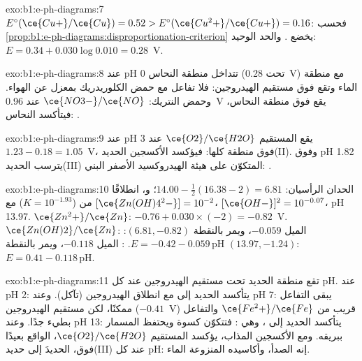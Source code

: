 \begin{solution}{exo:b1:e-ph-diagrams:7}
$E^\circ(\ce{Cu+}/\ce{Cu}) = 0.52 > E^\circ(\ce{Cu^2+}/\ce{Cu+}) = 0.16$: فحسب
\cref{prop:b1:e-ph-diagrams:disproportionation-criterion} يخضع 
. والحد الوحيد: $E = 0.34 + 0.030\log 0.010 =
0.28$~V.
\end{solution}

\begin{solution}{exo:b1:e-ph-diagrams:8}
عند pH 0 تتداخل منطقة النحاس (تحت 0.28~V) مع منطقة الماء
وتقع فوق مستقيم الهيدروجين: فلا تفاعل مع حمض الكلوريدريك
بمعزل عن الهواء. وحمض النتريك: $\ce{NO3-}/\ce{NO}$ عند 0.96~V يقع فوق
منطقة النحاس، فيتأكسد النحاس:
.
\end{solution}

\begin{solution}{exo:b1:e-ph-diagrams:9}
عند pH 3 يقع المستقيم $\ce{O2}/\ce{H2O}$ عند $1.23 - 0.18 = 1.05$~V، فوق
منطقة  كلها: فيؤكسد الأكسجين الحديد(II). وفوق pH 1.82 يترسب
الحديد(III) المتكوّن على هيئة الهيدروكسيد الأصفر البني:
.
\end{solution}

\begin{solution}{exo:b1:e-ph-diagrams:10}
الحدان الرأسيان: $14.00 - \frac12(16.38 - 2) = 6.81$؛ و، انطلاقًا من
 ($K = 10^{-1.93}$) مع
$[\ce{Zn(OH)4^2-}] = 10^{-2}$، $[\ce{OH-}]^2 = 10^{-0.07}$، pH 13.97.
$\ce{Zn^2+}/\ce{Zn}$: $-0.76 + 0.030 \times (-2) = -0.82$~V. $\ce{Zn(OH)2}/\ce{Zn}$:
الميل $-0.059$، ويمر بالنقطة $(6.81, -0.82)$: $E = -0.42 - 0.059\,\mathrm{pH}$.
: الميل $-0.118$، ويمر بالنقطة
$(13.97, -1.24)$: $E = 0.41 - 0.118\,\mathrm{pH}$.
\end{solution}

\begin{solution}{exo:b1:e-ph-diagrams:11}
تقع منطقة الحديد تحت مستقيم الهيدروجين عند كل pH. عند pH 2: يتأكسد
الحديد إلى  مع انطلاق الهيدروجين (تآكل). وعند pH 7:
يبقى التفاعل ممكنًا، لكن مستقيم الهيدروجين ($-0.41$~V)
قريب من $\ce{Fe^2+}/\ce{Fe}$ والتفاعل بطيء جدًا. وعند pH 13: يتأكسد الحديد
إلى ، وهي : فتتكوّن كسوة ويحتفظ
المسمار ببريقه. ومع الأكسجين المذاب، يؤكسد المستقيم $\ce{O2}/\ce{H2O}$،
الواقع بعيدًا فوق، الحديدَ إلى حديد(III) عند كل pH: إنه الصدأ، 
وأكاسيده المنزوعة الماء.
\end{solution}

